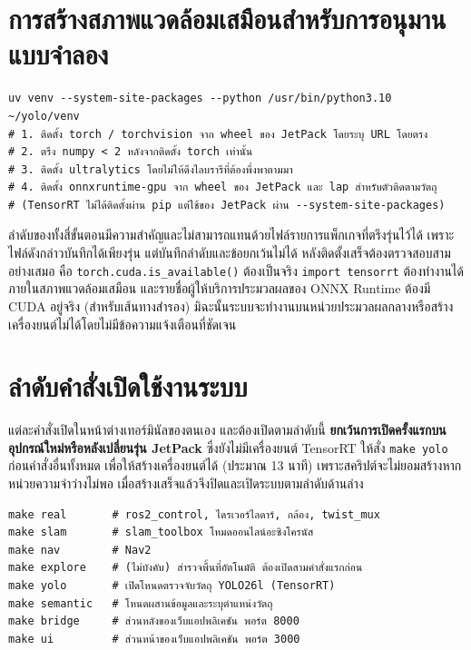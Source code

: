 \documentclass[a4paper,12pt]{report}
\begin{document}
\section{การสร้างสภาพแวดล้อมเสมือนสำหรับการอนุมานแบบจำลอง}

{\small
\begin{verbatim}
uv venv --system-site-packages --python /usr/bin/python3.10 ~/yolo/venv
# 1. ติดตั้ง torch / torchvision จาก wheel ของ JetPack โดยระบุ URL โดยตรง
# 2. ตรึง numpy < 2 หลังจากติดตั้ง torch เท่านั้น
# 3. ติดตั้ง ultralytics โดยไม่ให้ดึงไลบรารีที่ต้องพึ่งพาตามมา
# 4. ติดตั้ง onnxruntime-gpu จาก wheel ของ JetPack และ lap สำหรับตัวติดตามวัตถุ
# (TensorRT ไม่ได้ติดตั้งผ่าน pip แต่ใช้ของ JetPack ผ่าน --system-site-packages)
\end{verbatim}
}

ลำดับของทั้งสี่ขั้นตอนมีความสำคัญและไม่สามารถแทนด้วยไฟล์รายการแพ็กเกจที่ตรึงรุ่นไว้ได้
เพราะไฟล์ดังกล่าวบันทึกได้เพียงรุ่น แต่บันทึกลำดับและข้อยกเว้นไม่ได้
หลังติดตั้งเสร็จต้องตรวจสอบสามอย่างเสมอ
คือ \texttt{torch.cuda.is\_available()} ต้องเป็นจริง
\texttt{import tensorrt} ต้องทำงานได้ภายในสภาพแวดล้อมเสมือน
และรายชื่อผู้ให้บริการประมวลผลของ ONNX Runtime ต้องมี CUDA อยู่จริง (สำหรับเส้นทางสำรอง)
มิฉะนั้นระบบจะทำงานบนหน่วยประมวลผลกลางหรือสร้างเครื่องยนต์ไม่ได้โดยไม่มีข้อความแจ้งเตือนที่ชัดเจน

\section{ลำดับคำสั่งเปิดใช้งานระบบ}

แต่ละคำสั่งเปิดในหน้าต่างเทอร์มินัลของตนเอง และต้องเปิดตามลำดับนี้
\textbf{ยกเว้นการเปิดครั้งแรกบนอุปกรณ์ใหม่หรือหลังเปลี่ยนรุ่น JetPack}
ซึ่งยังไม่มีเครื่องยนต์ TensorRT ให้สั่ง \texttt{make yolo} ก่อนคำสั่งอื่นทั้งหมด
เพื่อให้สร้างเครื่องยนต์ได้ (ประมาณ 13 นาที) เพราะสคริปต์จะไม่ยอมสร้างหากหน่วยความจำว่างไม่พอ
เมื่อสร้างเสร็จแล้วจึงปิดและเปิดระบบตามลำดับด้านล่าง

{\small
\begin{verbatim}
make real       # ros2_control, ไดรเวอร์ไลดาร์, กล้อง, twist_mux
make slam       # slam_toolbox โหมดออนไลน์อะซิงโครนัส
make nav        # Nav2
make explore    # (ไม่บังคับ) สำรวจพื้นที่อัตโนมัติ ต้องเปิดสามคำสั่งแรกก่อน
make yolo       # เปิดโหนดตรวจจับวัตถุ YOLO26l (TensorRT)
make semantic   # โหนดผสานข้อมูลและระบุตำแหน่งวัตถุ
make bridge     # ส่วนหลังของเว็บแอปพลิเคชัน พอร์ต 8000
make ui         # ส่วนหน้าของเว็บแอปพลิเคชัน พอร์ต 3000
\end{verbatim}
}
\end{document}
